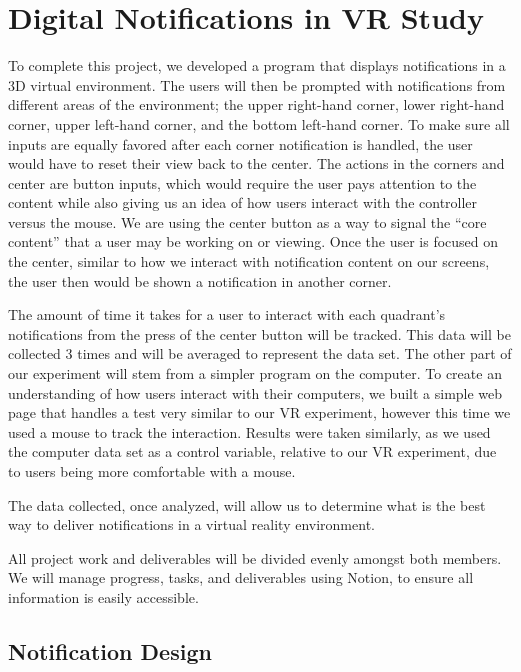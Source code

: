 \documentclass[acmlarge]{acmart}
\begin{document}
\section{Digital Notifications in VR Study}

To complete this project, we developed a program that displays notifications in a 3D virtual environment. The users will then be prompted with notifications from different areas of the environment; the upper right-hand corner, lower right-hand corner, upper left-hand corner, and the bottom left-hand corner. To make sure all inputs are equally favored after each corner notification is handled, the user would have to reset their view back to the center. The actions in the corners and center are button inputs, which would require the user pays attention to the content while also giving us an idea of how users interact with the controller versus the mouse. We are using the center button as a way to signal the “core content” that a user may be working on or viewing. Once the user is focused on the center, similar to how we interact with notification content on our screens, the user then would be shown a notification in another corner. 

The amount of time it takes for a user to interact with each quadrant’s notifications from the press of the center button will be tracked. This data will be collected 3 times and will be averaged to represent the data set. The other part of our experiment will stem from a simpler program on the computer. To create an understanding of how users interact with their computers, we built a simple web page that handles a test very similar to our VR experiment, however this time we used a mouse to track the interaction. Results were taken similarly, as we used the computer data set as a control variable, relative to our VR experiment, due to users being more comfortable with a mouse. 

The data collected, once analyzed, will allow us to determine what is the best way to deliver notifications in a virtual reality environment. 

All project work and deliverables will be divided evenly amongst both members. We will manage progress, tasks, and deliverables using Notion, to ensure all information is easily accessible.

\subsection{Notification Design}
\end{document}
